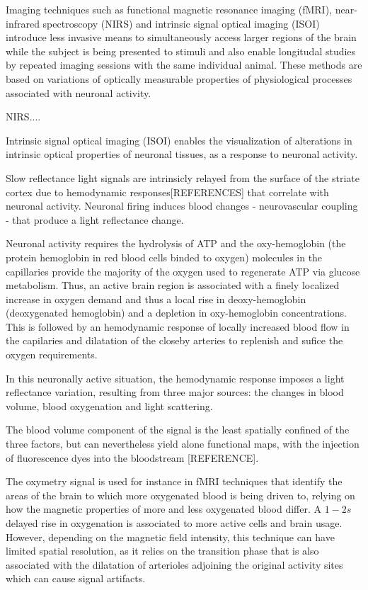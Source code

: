 Imaging techniques such as functional magnetic resonance imaging (fMRI), near-infrared spectroscopy (NIRS) and intrinsic signal optical imaging (ISOI) introduce less invasive means to simultaneously access larger regions of the brain while the subject is being presented to stimuli and also enable longitudal studies by repeated imaging sessions with the same individual animal. These methods are based on variations of optically measurable properties of physiological processes associated with neuronal activity.

NIRS....

Intrinsic signal optical imaging (ISOI) enables the visualization of alterations in intrinsic optical properties of neuronal tissues, as a response to neuronal activity.

Slow reflectance light signals are intrinsicly relayed from the surface of the striate cortex due to hemodynamic responses[REFERENCES] that correlate with neuronal activity. Neuronal firing induces blood changes - neurovascular coupling - that produce a light reflectance change.

Neuronal activity requires the hydrolysis of ATP and the oxy-hemoglobin (the protein hemoglobin in red blood cells binded to oxygen) molecules in the capillaries provide the majority of the oxygen used to regenerate ATP via glucose metabolism. Thus, an active brain region is associated with a finely localized increase in oxygen demand and thus a local rise in deoxy-hemoglobin (deoxygenated hemoglobin) and a depletion in oxy-hemoglobin concentrations. This is followed by an hemodynamic response of locally increased blood flow in the capilaries and dilatation of the closeby arteries to replenish and sufice the oxygen requirements.

In this neuronally active situation, the hemodynamic response imposes a light reflectance variation, resulting from three major sources: the changes in blood volume, blood oxygenation and light scattering.

The blood volume component of the signal is the least spatially confined of the three factors, but can nevertheless yield alone functional maps, with the injection of fluorescence dyes into the bloodstream [REFERENCE].

The oxymetry signal is used for instance in fMRI techniques that identify the areas of the brain to which more oxygenated blood is being driven to, relying on how the magnetic properties of more and less oxygenated blood differ. A $1-2s$ delayed rise in oxygenation is associated to more active cells and brain usage. However, depending on the magnetic field intensity, this technique can have limited spatial resolution, as it relies on the transition phase that is also associated with the dilatation of arterioles adjoining the original activity sites which can cause signal artifacts.

